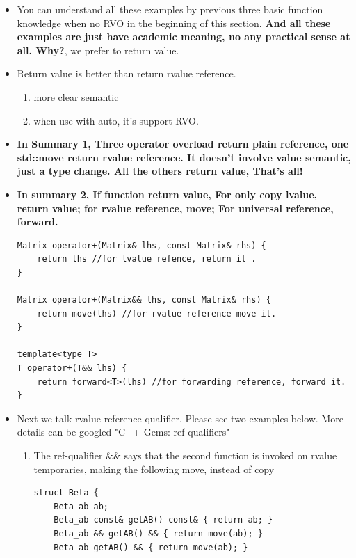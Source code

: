 \documentclass[a4paper,11pt,twoside]{book}
\begin{document}
\begin{itemize}
	
	\item You can understand all these examples by previous three basic function knowledge when no RVO in the beginning of this section. \textbf{And all these examples are just have academic meaning, no any practical sense at all. Why?}, we prefer to return value. 

	
	\item Return value is better than return rvalue reference.
	\begin{enumerate}
		\item more clear semantic 
		\item when use with auto, it's support RVO.
	\end{enumerate}


	
	\item \textbf{In Summary 1, Three operator overload return plain reference, one std::move return rvalue reference. It doesn't involve value semantic, just a type change. All the others return value, That's all!}
	
	\item \textbf{In summary 2, If function return value, For only copy lvalue, return value; for rvalue reference, move;  For universal reference, forward. }
	
\begin{lstlisting}[numbers=none]
Matrix operator+(Matrix& lhs, const Matrix& rhs) {
	return lhs //for lvalue refence, return it .
}
	
Matrix operator+(Matrix&& lhs, const Matrix& rhs) {
	return move(lhs) //for rvalue reference move it.
}
	
template<type T>
T operator+(T&& lhs) {
	return forward<T>(lhs) //for forwarding reference, forward it.
}
\end{lstlisting}

	
	\item Next we talk rvalue reference qualifier. Please see two examples below. More details can be googled  "C++ Gems: ref-qualifiers"
	\begin{enumerate}
		

	
		\item The ref-qualifier \&\& says that the second function is invoked on rvalue temporaries, making the following move, instead of copy
	
\begin{lstlisting}
struct Beta {
	Beta_ab ab;
	Beta_ab const& getAB() const& { return ab; }
	Beta_ab && getAB() && { return move(ab); }
	Beta_ab getAB() && { return move(ab); }
	

\end{lstlisting}
\end{enumerate}
\end{itemize}
\end{document}
